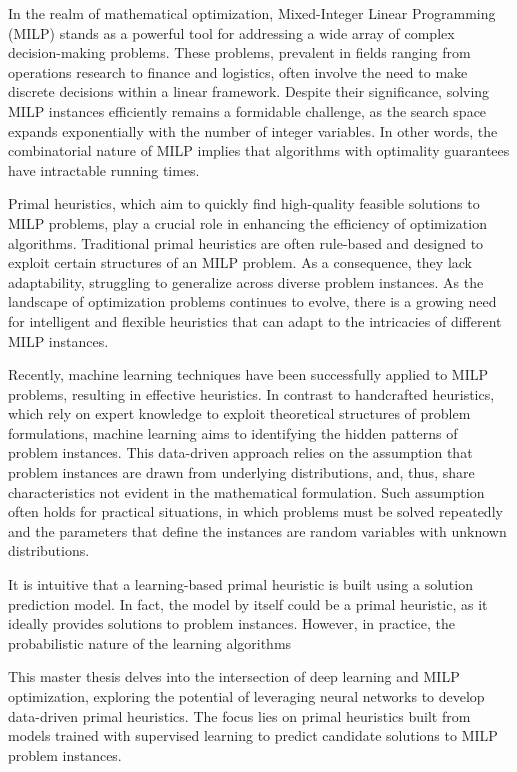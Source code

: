 In the realm of mathematical optimization, Mixed-Integer Linear Programming (MILP) stands as a powerful tool for addressing a wide array of complex decision-making problems.
These problems, prevalent in fields ranging from operations research to finance and logistics, often involve the need to make discrete decisions within a linear framework.
Despite their significance, solving MILP instances efficiently remains a formidable challenge, as the search space expands exponentially with the number of integer variables.
In other words, the combinatorial nature of MILP implies that algorithms with optimality guarantees have intractable running times.

Primal heuristics, which aim to quickly find high-quality feasible solutions to MILP problems, play a crucial role in enhancing the efficiency of optimization algorithms.
Traditional primal heuristics are often rule-based and designed to exploit certain structures of an MILP problem.
As a consequence, they lack adaptability, struggling to generalize across diverse problem instances.
As the landscape of optimization problems continues to evolve, there is a growing need for intelligent and flexible heuristics that can adapt to the intricacies of different MILP instances.

Recently, machine learning techniques have been successfully applied to MILP problems, resulting in effective heuristics.
In contrast to handcrafted heuristics, which rely on expert knowledge to exploit theoretical structures of problem formulations, machine learning aims to identifying the hidden patterns of problem instances.
This data-driven approach relies on the assumption that problem instances are drawn from underlying distributions, and, thus, share characteristics not evident in the mathematical formulation.
Such assumption often holds for practical situations, in which problems must be solved repeatedly and the parameters that define the instances are random variables with unknown distributions.

It is intuitive that a learning-based primal heuristic is built using a solution prediction model.
In fact, the model by itself could be a primal heuristic, as it ideally provides solutions to problem instances.
However, in practice, the probabilistic nature of the learning algorithms 


This master thesis delves into the intersection of deep learning and MILP optimization, exploring the potential of leveraging neural networks to develop data-driven primal heuristics.
The focus lies on primal heuristics built from models trained with supervised learning to predict candidate solutions to MILP problem instances.


